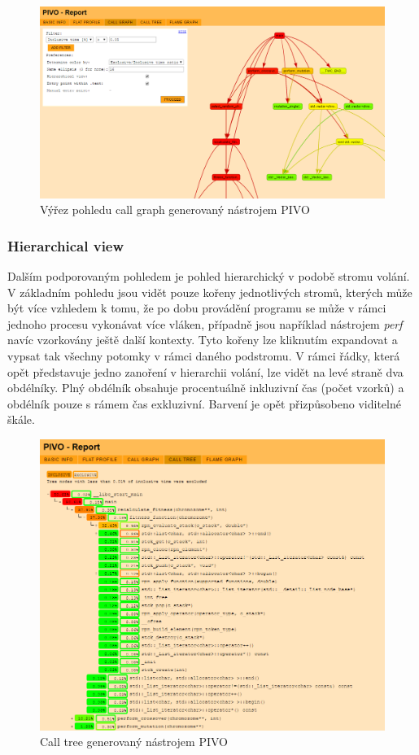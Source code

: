 \documentclass[czech,BP]{thesiskiv}
\begin{document}
\begin{figure}[h]
    \centering
    \includegraphics[interpolate,width=1.0\textwidth]{img/pivo_graph.png}
    \caption{Výřez pohledu call graph generovaný nástrojem PIVO}
    \label{obr:implgraph}
\end{figure}

\subsubsection*{Hierarchical view}

Dalším podporovaným pohledem je pohled hierarchický v podobě stromu volání. V základním pohledu jsou vidět pouze kořeny jednotlivých stromů, kterých může být více vzhledem k tomu, že po dobu provádění programu se může v rámci jednoho procesu vykonávat více vláken, případně jsou například nástrojem \emph{perf} navíc vzorkovány ještě další kontexty. Tyto kořeny lze kliknutím expandovat a vypsat tak všechny potomky v rámci daného podstromu. V rámci řádky, která opět představuje jedno zanoření v hierarchii volání, lze vidět na levé straně dva obdélníky. Plný obdélník obsahuje procentuálně inkluzivní čas (počet vzorků) a obdélník pouze s rámem čas exkluzivní. Barvení je opět přizpůsobeno viditelné škále.

\begin{figure}[h]
    \centering
    \includegraphics[interpolate,width=1.0\textwidth]{img/pivo_tree.png}
    \caption{Call tree generovaný nástrojem PIVO}
    \label{obr:impltree}
\end{figure}
\end{document}
